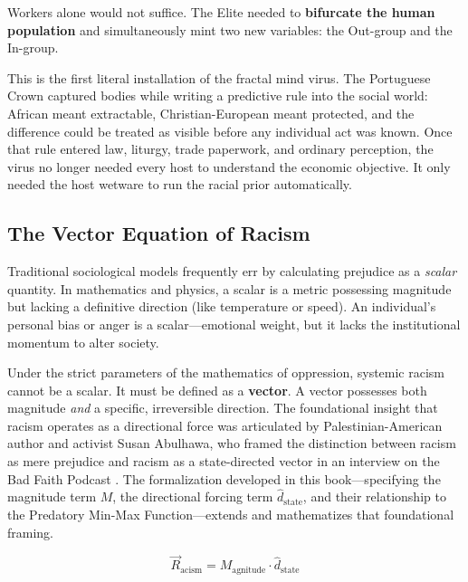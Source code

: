 Workers alone would not suffice. The Elite needed to \textbf{bifurcate the human population} and simultaneously mint two new variables: the Out-group and the In-group.

This is the first literal installation of the fractal mind virus. The Portuguese Crown captured bodies while writing a predictive rule into the social world: African meant extractable, Christian-European meant protected, and the difference could be treated as visible before any individual act was known. Once that rule entered law, liturgy, trade paperwork, and ordinary perception, the virus no longer needed every host to understand the economic objective. It only needed the host wetware to run the racial prior automatically.

\subsection{The Vector Equation of Racism}

Traditional sociological models frequently err by calculating prejudice as a \textit{scalar} quantity. In mathematics and physics, a scalar is a metric possessing magnitude but lacking a definitive direction (like temperature or speed). An individual's personal bias or anger is a scalar---emotional weight, but it lacks the institutional momentum to alter society.

Under the strict parameters of the mathematics of oppression, systemic racism cannot be a scalar. It must be defined as a \textbf{vector}. A vector possesses both magnitude \textit{and} a specific, irreversible direction. The foundational insight that racism operates as a directional force was articulated by Palestinian-American author and activist Susan Abulhawa, who framed the distinction between racism as mere prejudice and racism as a state-directed vector in an interview on the Bad Faith Podcast \cite{abulhawa}. The formalization developed in this book---specifying the magnitude term $M$, the directional forcing term $\hat{d}_{\text{state}}$, and their relationship to the Predatory Min-Max Function---extends and mathematizes that foundational framing.

\begin{equation}\label{eq:2.1-racism-vector}
\vec{R}_{\text{acism}} = M_{\text{agnitude}} \cdot \hat{d}_{\text{state}}
\end{equation}


